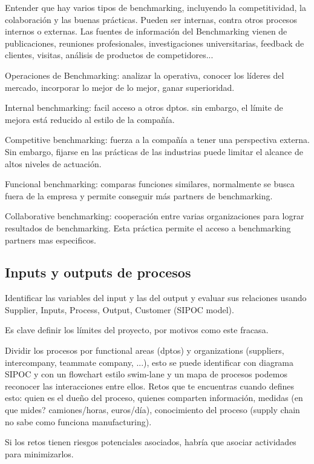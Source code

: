 \documentclass[]{article}
\begin{document}
Entender que hay varios tipos de benchmarking, incluyendo la competitividad, la colaboración y las buenas prácticas.
Pueden ser internas, contra otros procesos internos o externas. Las fuentes de información del Benchmarking vienen de publicaciones, reuniones profesionales, investigaciones universitarias, feedback de clientes, visitas, análisis de productos de competidores...

Operaciones de Benchmarking: analizar la operativa, conocer los líderes del mercado, incorporar lo mejor de lo mejor, ganar superioridad. 

Internal benchmarking: facil acceso a otros dptos. sin embargo, el límite de mejora está reducido al estilo de la compañía.

Competitive benchmarking: fuerza a la compañía a tener una perspectiva externa. Sin embargo, fijarse en las prácticas de las industrias puede limitar el alcance de altos niveles de actuación.

Funcional benchmarking: comparas funciones similares, normalmente se busca fuera de la empresa y permite conseguir más partners de benchmarking.

Collaborative benchmarking: cooperación entre varias organizaciones para lograr resultados de benchmarking. Esta práctica permite el acceso a benchmarking partners  mas especificos.  

\subsection{Inputs y outputs de procesos}

Identificar las variables del input y las del output y evaluar sus relaciones usando Supplier, Inputs, Process, Output, Customer (SIPOC model).

Es clave definir los límites del proyecto, por motivos como este fracasa.

Dividir los procesos por functional areas (dptos) y organizations (suppliers, intercompany, teammate company, ...), esto se puede identificar con diagrama SIPOC y con un flowchart estilo swim-lane y un mapa de procesos podemos reconocer las interacciones entre ellos. Retos que te encuentras cuando defines esto: quien es el dueño del proceso, quienes comparten información, medidas (en que mides? camiones/horas, euros/día), conocimiento del proceso (supply chain no sabe como funciona manufacturing).

Si los retos tienen riesgos potenciales asociados, habría que asociar actividades para minimizarlos.
\end{document}
